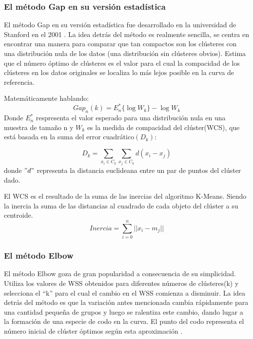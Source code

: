 \subsubsection{El método Gap en su versión estadística}
El método Gap en su versión estadística fue desarrollado en la universidad de Stanford en el 2001 \cite{Tibshirani2000EstimatingTN}. La idea detrás del método es realmente sencilla, se centra en encontrar una manera para comparar que tan compactos son los clústeres con una distribución nula de los datos (una distribución sin clústeres obvios). Estima que el número óptimo de clústeres es el valor para el cual la compacidad de los clústeres en los datos originales se localiza lo más lejos posible en la curva de referencia.

Matemáticamente hablando:
\begin{equation}
	Gap_n(k)= E_n^{*}\{\log W_k \} - \log W_k
\end{equation}
Donde $E_n^{*}$ respresenta el valor esperado para una distribución nula en una muestra de tamaño n y $W_k$ es la medida de compacidad del clúster(WCS), que está basada en la suma del error cuadrático$(D_k)$:

\begin{equation}
D_k = \sum_{x_i \in C_k}\sum_{x_j \in C_k} d(x_i - x_j) 
\end{equation}
donde $"d"$ representa la distancia euclideana entre un par de puntos del clúster dado.

El WCS es el resultado de la suma de las inercias del algoritmo K-Means. Siendo la inercia la suma de las distancias al cuadrado de cada objeto del clúster a su centroide.
\begin{equation}
	Inercia = \sum_{i = 0}^{n} ||x_i - m_j||
\end{equation}

\subsubsection{El método Elbow }
El método Elbow goza de gran popularidad a consecuencia de su simplicidad. Utiliza los valores de WSS obtenidos para diferentes números de clústeres(k) y selecciona el “k” para el cual el cambio en el WSS comienza a disminuir. La idea detrás del método es que la variación antes mencionada cambia rápidamente para una cantidad pequeña de grupos y luego se ralentiza este cambio, dando lugar a la formación de una especie de codo en la curva. El punto del codo representa el número inicial de clúster óptimos según esta aproximación \cite{Yuan2019ResearchOK}. 
